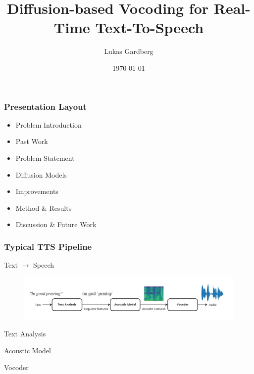 \documentclass{beamer}
\title{Diffusion-based Vocoding for Real-Time Text-To-Speech}
\author{Lukas Gardberg}
\institute{LTH}
\date{\today}
\begin{document}
\frame{\titlepage}

\begin{frame}
\frametitle{Presentation Layout}
\begin{itemize}
    \item Problem Introduction
    \item Past Work
    \item Problem Statement
    \item Diffusion Models
    \item Improvements
    \item Method \& Results
    \item Discussion \& Future Work
\end{itemize}
\end{frame}


\begin{frame}
\frametitle{Typical TTS Pipeline}

\vspace{1cm}

\begin{center}
{\large
    Text \quad $\longrightarrow$ \quad Speech
}
\end{center}

\vspace{1cm}

\pause

\begin{figure}[H]
    \centering
    \includegraphics[width=1\textwidth]{images/TTS.jpg}
\end{figure}

\vspace{1cm}

\begin{multicols}{3}
    \begin{center}

    Text Analysis

    \vfill\null
    \columnbreak

    Acoustic Model

    \vfill\null
    \columnbreak

    Vocoder

    \end{center}
\end{multicols}

\end{frame}
\end{document}
